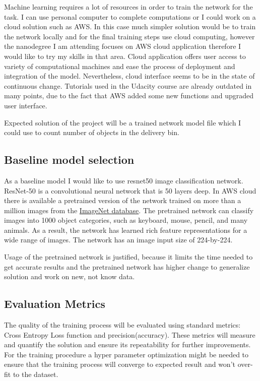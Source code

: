 \documentclass{article}
\begin{document}
Machine learning requires a lot of resources in order to train the network for the task. I can use personal computer to complete computations or I could work on a cloud solution such as AWS. In this case much simpler solution would be to train the network locally and for the final training steps use cloud computing, however the nanodegree I am attending focuses on AWS cloud application therefore I would like to try my skills in that area. Cloud application offers user access to variety of computational machines and ease the process of deployment and integration of the model. Nevertheless, cloud interface seems to be in the state of continuous change. Tutorials used in the Udacity course are already outdated in many points, due to the fact that AWS added some new functions and upgraded user interface. 

Expected solution of the project will be a trained network model file which I could use to count number of objects in the delivery bin. 

\subsection{Baseline model selection}
As a baseline model I would like to use resnet50 image classification network. ResNet-50 is a convolutional neural network that is 50 layers deep. In AWS cloud there is available a pretrained version of the network trained on more than a million images from the \href{http://www.image-net.org}{ImageNet database}. The pretrained network can classify images into 1000 object categories, such as keyboard, mouse, pencil, and many animals. As a result, the network has learned rich feature representations for a wide range of images. The network has an image input size of 224-by-224.

Usage of the pretrained network is justified, because it limits the time needed to get accurate results and the pretrained network has higher change to generalize solution and work on new, not know data.

\subsection{Evaluation Metrics}
The quality of the training process will be evaluated using standard metrics: Cross Entropy Loss function and precision(accuracy). These metrics will measure and quantify the solution and ensure its repeatability for further improvements. For the training procedure a hyper parameter optimization might be needed to ensure that the training process will converge to expected result and won't over-fit to the dataset.
\end{document}
